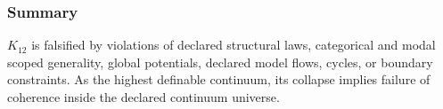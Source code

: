 \subsubsection{Summary}

$K_{12}$ is falsified by violations of declared structural laws,
categorical and modal scoped generality, global potentials, declared model flows,
cycles, or boundary constraints. As the highest definable continuum,
its collapse implies failure of coherence inside the declared continuum universe.
